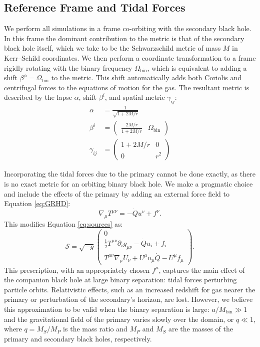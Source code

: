 \documentclass{emulateapj}
\newcommand{\al}{\alpha}
\newcommand{\be}{\beta}
\newcommand{\gam}{\gamma}
\newcommand{\Om}{\Omega}
\newcommand{\pd}{\partial}
\begin{document}
\subsection{Reference Frame and Tidal Forces}
\label{subsec:frameforces}

We perform all simulations in a frame co-orbiting with the secondary black hole.  In this frame the dominant contribution to the metric is that of the secondary black hole itself, which we take to be the Schwarzschild metric of mass $M$ in Kerr--Schild coordinates.  We then perform a coordinate transformation to a frame rigidly rotating with the binary frequency $\Om_\text{bin}$, which is equivalent to adding a shift $\be^\phi = \Om_\text{bin}$ to the metric.  This shift automatically adds both Coriolis and centrifugal forces to the equations of motion for the gas.  The resultant metric is described by the lapse $\al$, shift $\be^i$, and spatial metric $\gam_{ij}$:
\begin{align}
	\al &= \frac{1}{\sqrt{1+2M/r}} \\
	\be^i &= \begin{pmatrix} \frac{2M/r}{1+2M/r} & \Om_\text{bin} \end{pmatrix} \\
	\gam_{ij} &= \begin{pmatrix} 1+2M/r & 0 \\ 0 & r^2 \end{pmatrix}
\end{align}

Incorporating the tidal forces due to the primary cannot be done exactly, as there is no exact metric for an orbiting binary black hole.  We make a pragmatic choice and include the effects of the primary by adding an external force field to Equation \eqref{eq:GRHD}:
\begin{equation}
	\nabla_\mu T^{\mu\nu} = -\dot{Q} u^\nu + f^\nu . 
\end{equation}
This modifies Equation \eqref{eq:sources} as:
\begin{equation}
	\mathcal{S} = \sqrt{-g} \begin{pmatrix} 0 \\
                        \frac{1}{2}T^{\mu\nu}\pd_i g_{\mu\nu} - \dot{Q}u_i  + f_i \\
                        T^{\mu\nu}\nabla_\mu U_\nu + U^\mu u_\mu \dot{Q} - U^\mu f_\mu \end{pmatrix} .\label{eq:sourcesF}
\end{equation}
This prescription, with an appropriately chosen $f^\mu$, captures the main effect of the companion black hole at large binary separation: tidal forces perturbing particle orbits.  Relativistic effects, such as an increased redshift for gas nearer the primary or perturbation of the secondary's horizon, are lost. However, we believe this approximation to be valid when the binary separation is large: $a/M_\text{bin} \gg 1$ and the gravitational field of the primary varies slowly over the domain, or $q \ll 1$, where $q = M_S / M_P$ is the mass ratio and $M_P$ and $M_S$ are the masses of the primary and secondary black holes, respectively.
\end{document}
